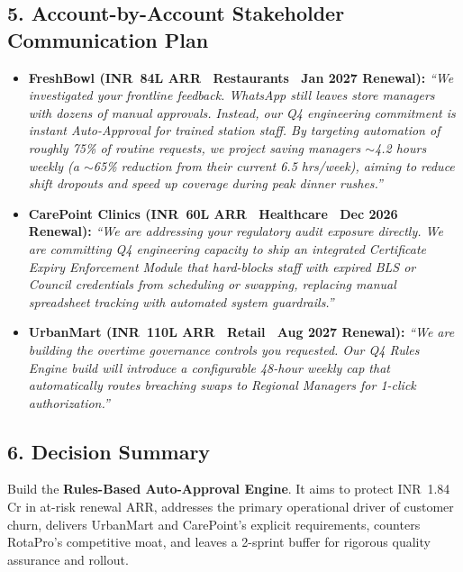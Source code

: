 \documentclass[10pt,a4paper]{article}
\newcommand{\INR}{INR~}
\begin{document}
\subsection*{5. Account-by-Account Stakeholder Communication Plan}
\begin{itemize}
    \item \textbf{FreshBowl (\INR 84L ARR \textbar\ Restaurants \textbar\ Jan 2027 Renewal):}
    \textit{``We investigated your frontline feedback. WhatsApp still leaves store managers with dozens of manual approvals. Instead, our Q4 engineering commitment is instant Auto-Approval for trained station staff. By targeting automation of roughly 75\% of routine requests, we project saving managers $\sim$4.2 hours weekly (a $\sim$65\% reduction from their current 6.5 hrs/week), aiming to reduce shift dropouts and speed up coverage during peak dinner rushes.''}
    \item \textbf{CarePoint Clinics (\INR 60L ARR \textbar\ Healthcare \textbar\ Dec 2026 Renewal):}
    \textit{``We are addressing your regulatory audit exposure directly. We are committing Q4 engineering capacity to ship an integrated Certificate Expiry Enforcement Module that hard-blocks staff with expired BLS or Council credentials from scheduling or swapping, replacing manual spreadsheet tracking with automated system guardrails.''}
    \item \textbf{UrbanMart (\INR 110L ARR \textbar\ Retail \textbar\ Aug 2027 Renewal):}
    \textit{``We are building the overtime governance controls you requested. Our Q4 Rules Engine build will introduce a configurable 48-hour weekly cap that automatically routes breaching swaps to Regional Managers for 1-click authorization.''}
\end{itemize}

\subsection*{6. Decision Summary}
Build the \textbf{Rules-Based Auto-Approval Engine}. It aims to protect \INR 1.84 Cr in at-risk renewal ARR, addresses the primary operational driver of customer churn, delivers UrbanMart and CarePoint's explicit requirements, counters RotaPro's competitive moat, and leaves a 2-sprint buffer for rigorous quality assurance and rollout.

\newpage
\enlargethispage{2\baselineskip}
\end{document}
